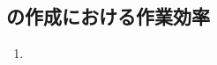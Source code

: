 \subsection{\Drawing の作成における作業効率}

\begin{Issues}{\TBW}
\begin{enumerate}[label=\sarrow]
\item[{\sarrow[red]}]
\end{enumerate}
\end{Issues}
